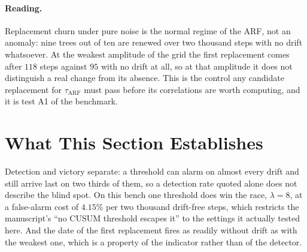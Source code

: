 \documentclass[11pt,a4paper]{article}
\begin{document}
\paragraph{Reading.} Replacement churn under pure noise is the normal regime of the ARF,
not an anomaly: nine trees out of ten are renewed over two thousand steps with no drift
whatsoever. At the weakest amplitude of the grid the first replacement comes after $118$ steps against
$95$ with no drift at all, so at that amplitude it does not distinguish a real change from
its absence. This is the control any candidate replacement for $\tau_{\mathrm{ARF}}$ must
pass before its correlations are worth computing, and it is test A1 of the benchmark.

\section{What This Section Establishes}

Detection and victory separate: a threshold can alarm on almost every drift and still
arrive last on two thirds of them, so a detection rate quoted alone does not describe the
blind spot. On this bench one threshold does win the race, $\lambda = 8$, at a false-alarm
cost of $4.15\%$ per two thousand drift-free steps, which restricts the manuscript's
``no CUSUM threshold escapes it'' to the settings it actually tested here. And the date of
the first replacement fires as readily without drift as with the weakest one, which is a
property of the indicator rather than of the detector.
\end{document}
